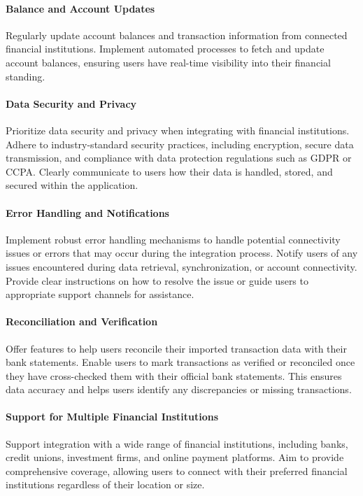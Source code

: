\paragraph{Balance and Account Updates}
Regularly update account balances and transaction information from connected financial 
institutions. Implement automated processes to fetch and update account balances, ensuring users have real-time 
visibility into their financial standing.

\paragraph{Data Security and Privacy}
Prioritize data security and privacy when integrating with financial institutions. Adhere 
to industry-standard security practices, including encryption, secure data transmission, and compliance with data 
protection regulations such as GDPR or CCPA. Clearly communicate to users how their data is handled, stored, and 
secured within the application.

\paragraph{Error Handling and Notifications}
Implement robust error handling mechanisms to handle potential connectivity issues 
or errors that may occur during the integration process. Notify users of any issues encountered during data retrieval, 
synchronization, or account connectivity. Provide clear instructions on how to resolve the issue or guide users to 
appropriate support channels for assistance.

\paragraph{Reconciliation and Verification}
Offer features to help users reconcile their imported transaction data with their 
bank statements. Enable users to mark transactions as verified or reconciled once they have cross-checked them with 
their official bank statements. This ensures data accuracy and helps users identify any discrepancies or missing 
transactions.

\paragraph{Support for Multiple Financial Institutions}
Support integration with a wide range of financial institutions, including 
banks, credit unions, investment firms, and online payment platforms. Aim to provide comprehensive coverage, allowing 
users to connect with their preferred financial institutions regardless of their location or size.

